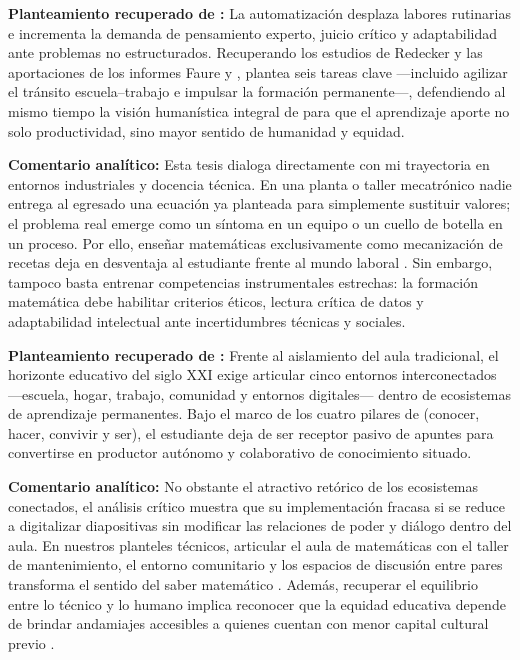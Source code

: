 \documentclass[spanish,letterpaper,oneside]{article}
\begin{document}
\begin{tcolorbox}[colback=iiiepeWarm,colframe=iiiepeOrange!90!black,title=\textbf{Idea 3 · Brecha escuela--trabajo, aprendizaje permanente y sentido humanista integral},breakable]
\textbf{Planteamiento recuperado de \citet{scott2015futuro}:} La automatización desplaza labores rutinarias e incrementa la demanda de pensamiento experto, juicio crítico y adaptabilidad ante problemas no estructurados. Recuperando los estudios de Redecker y las aportaciones de los informes Faure y \citet{delors1996educacion}, \citet{scott2015futuro} plantea seis tareas clave —incluido agilizar el tránsito escuela--trabajo e impulsar la formación permanente—, defendiendo al mismo tiempo la visión humanística integral de \citet{unesco2015replantear} para que el aprendizaje aporte no solo productividad, sino mayor sentido de humanidad y equidad.

\medskip
\textbf{Comentario analítico:} Esta tesis dialoga directamente con mi trayectoria en entornos industriales y docencia técnica. En una planta o taller mecatrónico nadie entrega al egresado una ecuación ya planteada para simplemente sustituir valores; el problema real emerge como un síntoma en un equipo o un cuello de botella en un proceso. Por ello, enseñar matemáticas exclusivamente como mecanización de recetas deja en desventaja al estudiante frente al mundo laboral \citep{conalep2025mecatronica}. Sin embargo, tampoco basta entrenar competencias instrumentales estrechas: la formación matemática debe habilitar criterios éticos, lectura crítica de datos y adaptabilidad intelectual ante incertidumbres técnicas y sociales.
\end{tcolorbox}

\begin{tcolorbox}[colback=iiiepePale,colframe=iiiepeBlue,title=\textbf{Idea 4 · Ecosistemas de aprendizaje (formal--no formal--informal) y estudiante como productor},breakable]
\textbf{Planteamiento recuperado de \citet{scott2015futuro}:} Frente al aislamiento del aula tradicional, el horizonte educativo del siglo XXI exige articular cinco entornos interconectados —escuela, hogar, trabajo, comunidad y entornos digitales— dentro de ecosistemas de aprendizaje permanentes. Bajo el marco de los cuatro pilares de \citet{delors1996educacion} (conocer, hacer, convivir y ser), el estudiante deja de ser receptor pasivo de apuntes para convertirse en productor autónomo y colaborativo de conocimiento situado.

\medskip
\textbf{Comentario analítico:} No obstante el atractivo retórico de los ecosistemas conectados, el análisis crítico muestra que su implementación fracasa si se reduce a digitalizar diapositivas sin modificar las relaciones de poder y diálogo dentro del aula. En nuestros planteles técnicos, articular el aula de matemáticas con el taller de mantenimiento, el entorno comunitario y los espacios de discusión entre pares transforma el sentido del saber matemático \citep{sep2023pensamiento}. Además, recuperar el equilibrio entre lo técnico y lo humano implica reconocer que la equidad educativa depende de brindar andamiajes accesibles a quienes cuentan con menor capital cultural previo \citep{unesco2015replantear}.
\end{tcolorbox}
\end{document}
